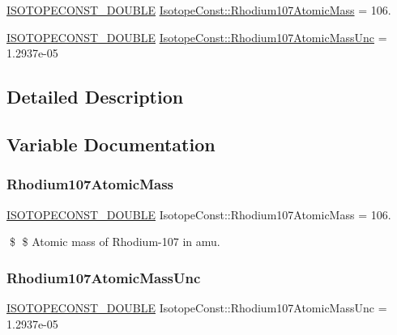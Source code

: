 \begin{DoxyCompactItemize}
\item 
\mbox{\hyperlink{group___isotope_const-_macros_ga8f45a7272ce02c0b4c65c44636ed719a}{I\+S\+O\+T\+O\+P\+E\+C\+O\+N\+S\+T\+\_\+\+D\+O\+U\+B\+LE}} \mbox{\hyperlink{group___isotope_const-_rhodium-_rh107_ga6e08326885ce95c1d445641afab660a1}{Isotope\+Const\+::\+Rhodium107\+Atomic\+Mass}} = 106.
\item 
\mbox{\hyperlink{group___isotope_const-_macros_ga8f45a7272ce02c0b4c65c44636ed719a}{I\+S\+O\+T\+O\+P\+E\+C\+O\+N\+S\+T\+\_\+\+D\+O\+U\+B\+LE}} \mbox{\hyperlink{group___isotope_const-_rhodium-_rh107_gaff242666b372cac5bf24ec4f644dcf57}{Isotope\+Const\+::\+Rhodium107\+Atomic\+Mass\+Unc}} = 1.\+2937e-\/05
\end{DoxyCompactItemize}


\subsection{Detailed Description}


\subsection{Variable Documentation}
\mbox{\label{group___isotope_const-_rhodium-_rh107_ga6e08326885ce95c1d445641afab660a1}} 
\subsubsection{\texorpdfstring{Rhodium107\+Atomic\+Mass}{Rhodium107AtomicMass}}
{\footnotesize\ttfamily \mbox{\hyperlink{group___isotope_const-_macros_ga8f45a7272ce02c0b4c65c44636ed719a}{I\+S\+O\+T\+O\+P\+E\+C\+O\+N\+S\+T\+\_\+\+D\+O\+U\+B\+LE}} Isotope\+Const\+::\+Rhodium107\+Atomic\+Mass = 106.}

\$ \$ Atomic mass of Rhodium-\/107 in amu. \mbox{\label{group___isotope_const-_rhodium-_rh107_gaff242666b372cac5bf24ec4f644dcf57}} 
\subsubsection{\texorpdfstring{Rhodium107\+Atomic\+Mass\+Unc}{Rhodium107AtomicMassUnc}}
{\footnotesize\ttfamily \mbox{\hyperlink{group___isotope_const-_macros_ga8f45a7272ce02c0b4c65c44636ed719a}{I\+S\+O\+T\+O\+P\+E\+C\+O\+N\+S\+T\+\_\+\+D\+O\+U\+B\+LE}} Isotope\+Const\+::\+Rhodium107\+Atomic\+Mass\+Unc = 1.\+2937e-\/05}

